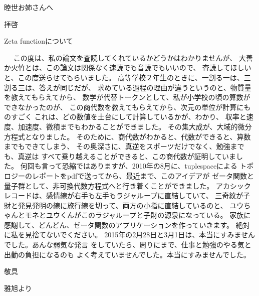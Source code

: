\documentclass{jsarticle}
\begin{document}
\begin{flushleft}
睦世お姉さんへ
\end{flushleft}
\begin{flushleft}
拝啓
\end{flushleft}

\begin{center}
	\LARGE{Zeta functionについて}
\end{center}


\noindent
　  この度は、私の論文を査読してくれているかどうかはわかりませんが、
大善か火竹とは、この論文は関係なく速読でも音読でもいいので、
査読してほしいと、この度送らせてもらいました。
高等学校２年生のときに、一割る一は、三割る三は、答えが同じだが、
求めている過程の理由が違うというのと、物質量を教えてもらえてから、
数学が代替トークンとして、私が小学校の頃の算数ができなかったのが、
この商代数を教えてもらえてから、次元の単位が計算にものすごく
これは、どの数値を土台にして計算しているかが、わかり、
収率と速度、加速度、微積までもわかることができました。
その集大成が、大域的微分方程式となりました。
そのために、商代数がわかると、代数ができると、算数までもできてしまう、
その奥深さに、真逆をスポーツだけでなく、勉強までも、真逆は
すべて乗り越えることができると、この商代数が証明していました。
何回も言って恐縮ではありますが、2010年の8月に、tuplespaceによる
トポロジーのレポートをpdfで送ってから、最近まで、このアイデアが
ゼータ関数と量子群として、非可換代数方程式へと行き着くことができました。
アカシックレコードは、感情線が右手も左手もラジャループに直結していて、
三奇紋が子財と発見発明の線に旅行線を切って、両方の小指に直結しているのと、
ユウちゃんとモネとユウくんがこのラジャループと子財の源泉になっている。
家族に感謝して、どんどん、ゼータ関数のアプリケーションを作っていきます。
絶対に私を見捨てないでください。
2015年の2月28日と3月1日は、本当にすみませんでした。あんな弱気な発言
をしていたら、周りにまで、仕事と勉強のやる気と出勤の負担になるのも
よく考えていませんでした。本当にすみませんでした。

\begin{flushright}
敬具
\end{flushright}

\begin{flushright}
雅旭より
\end{flushright}
\end{document}
